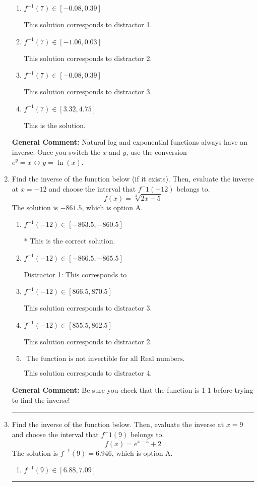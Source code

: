 \documentclass{extbook}[14pt]
\newcommand{\litem}[1]{\item #1

\rule{\textwidth}{0.4pt}}
\begin{document}
\begin{enumerate}
{\begin{enumerate}[label=\Alph*.]
 This solution corresponds to distractor 4.
\item \( f^{-1}(7) \in [-0.08, 0.39] \)

 This solution corresponds to distractor 1.
\item \( f^{-1}(7) \in [-1.06, 0.03] \)

 This solution corresponds to distractor 2.
\item \( f^{-1}(7) \in [-0.08, 0.39] \)

 This solution corresponds to distractor 3.
\item \( f^{-1}(7) \in [3.32, 4.75] \)

 This is the solution.
\end{enumerate}

\textbf{General Comment:} Natural log and exponential functions always have an inverse. Once you switch the $x$ and $y$, use the conversion $ e^y = x \leftrightarrow y=\ln(x)$.
}
\litem{
Find the inverse of the function below (if it exists). Then, evaluate the inverse at $x = -12$ and choose the interval that $f^-1(-12)$ belongs to.
\[ f(x) = \sqrt[3]{2 x - 5} \]The solution is \( -861.5 \), which is option A.\begin{enumerate}[label=\Alph*.]
\item \( f^{-1}(-12) \in [-863.5, -860.5] \)

* This is the correct solution.
\item \( f^{-1}(-12) \in [-866.5, -865.5] \)

 Distractor 1: This corresponds to 
\item \( f^{-1}(-12) \in [866.5, 870.5] \)

 This solution corresponds to distractor 3.
\item \( f^{-1}(-12) \in [855.5, 862.5] \)

 This solution corresponds to distractor 2.
\item \( \text{ The function is not invertible for all Real numbers. } \)

 This solution corresponds to distractor 4.
\end{enumerate}

\textbf{General Comment:} Be sure you check that the function is 1-1 before trying to find the inverse!
}
\litem{
Find the inverse of the function below. Then, evaluate the inverse at $x = 9$ and choose the interval that $f^-1(9)$ belongs to.
\[ f(x) = e^{x-5}+2 \]The solution is \( f^{-1}(9) = 6.946 \), which is option A.\begin{enumerate}[label=\Alph*.]
\item \( f^{-1}(9) \in [6.88, 7.09] \)


\end{enumerate}}
\end{enumerate}
\end{document}
